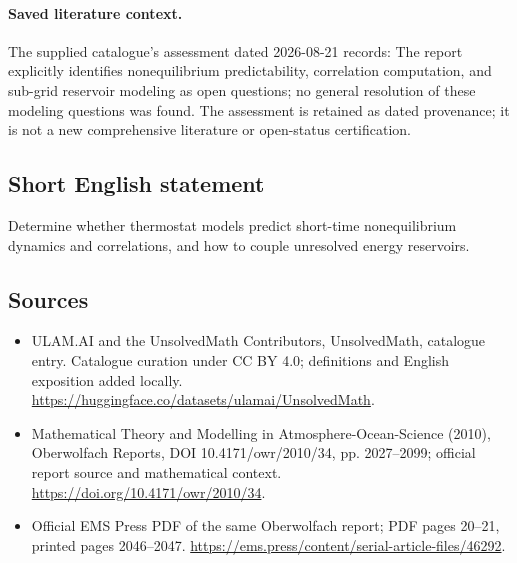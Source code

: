\documentclass[11pt]{article}
\begin{document}
\paragraph{Saved literature context.} The supplied catalogue's assessment dated 2026-08-21 records: The report explicitly identifies nonequilibrium predictability, correlation computation, and sub-grid reservoir modeling as open questions; no general resolution of these modeling questions was found. The assessment is retained as dated provenance; it is not a new comprehensive literature or open-status certification.
\subsection{Short English statement}
Determine whether thermostat models predict short-time nonequilibrium dynamics and correlations, and how to couple unresolved energy reservoirs.
\subsection{Sources}
\begin{itemize}
\item[\hypertarget{source:statement:1}{S1}] ULAM.AI and the UnsolvedMath Contributors, UnsolvedMath, catalogue entry. Catalogue curation under CC BY 4.0; definitions and English exposition added locally.
\url{https://huggingface.co/datasets/ulamai/UnsolvedMath}.
\item[\hypertarget{source:statement:2}{S2}] Mathematical Theory and Modelling in Atmosphere-Ocean-Science (2010), Oberwolfach Reports, DOI 10.4171/owr/2010/34, pp. 2027--2099; official report source and mathematical context.
\url{https://doi.org/10.4171/owr/2010/34}.
\item[\hypertarget{source:statement:3}{S3}] Official EMS Press PDF of the same Oberwolfach report; PDF pages 20--21, printed pages 2046--2047.
\url{https://ems.press/content/serial-article-files/46292}.
\end{itemize}
\label{end:statement}
\end{document}
